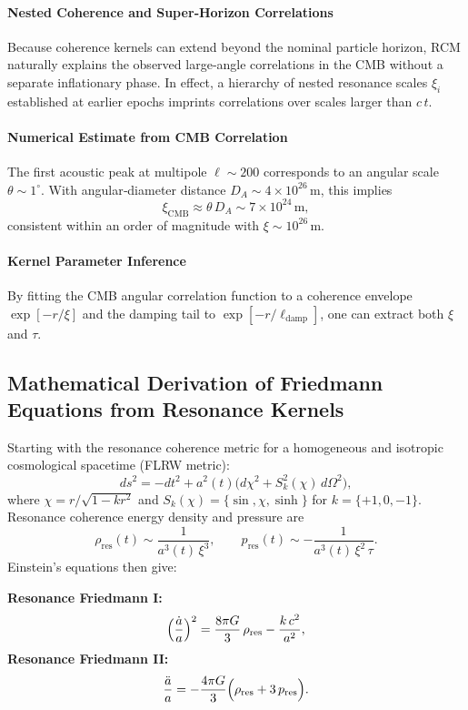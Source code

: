 \paragraph{Nested Coherence and Super‐Horizon Correlations}  
Because coherence kernels can extend beyond the nominal particle horizon, RCM naturally explains the observed large‐angle correlations in the CMB without a separate inflationary phase. In effect, a hierarchy of nested resonance scales \(\xi_i\) established at earlier epochs imprints correlations over scales larger than \(c\,t\).

\paragraph{Numerical Estimate from CMB Correlation}  
The first acoustic peak at multipole \(\ell\sim200\) corresponds to an angular scale \(\theta\sim1^\circ\). With angular‐diameter distance \(D_A\sim4\times10^{26}\,\mathrm{m}\), this implies
\[
\xi_{\mathrm{CMB}}\approx \theta\,D_A 
\sim 7\times10^{24}\,\mathrm{m},
\]
consistent within an order of magnitude with \(\xi\sim10^{26}\,\mathrm{m}\).

\paragraph{Kernel Parameter Inference}  
By fitting the CMB angular correlation function to a coherence envelope \(\exp[-r/\xi]\) and the damping tail to \(\exp[-r/\ell_{\mathrm{damp}}]\), one can extract both \(\xi\) and \(\tau\).

\subsection{Mathematical Derivation of Friedmann Equations from Resonance Kernels}

Starting with the resonance coherence metric for a homogeneous and isotropic cosmological spacetime (FLRW metric):
\[
ds^2 = -dt^2 + a^2(t)\!\bigl(d\chi^2 + S_k^2(\chi)\,d\Omega^2\bigr),
\]
where \(\chi=r/\sqrt{1-kr^2}\) and \(S_k(\chi)=\{\sin,\chi,\sinh\}\) for \(k=\{+1,0,-1\}\).  Resonance coherence energy density and pressure are
\[
\rho_{\mathrm{res}}(t)\sim \frac{1}{a^3(t)\,\xi^3}, 
\qquad
p_{\mathrm{res}}(t)\sim -\frac{1}{a^3(t)\,\xi^2\,\tau}.
\]
Einstein’s equations then give:

\begin{framed}
\noindent\textbf{Resonance Friedmann I:}
\[
\Bigl(\frac{\dot a}{a}\Bigr)^2
= \frac{8\pi G}{3}\,\rho_{\mathrm{res}}
- \frac{k\,c^2}{a^2},
\]
\textbf{Resonance Friedmann II:}
\[
\frac{\ddot a}{a}
= -\frac{4\pi G}{3}\Bigl(\rho_{\mathrm{res}}+3\,p_{\mathrm{res}}\Bigr).
\]
\end{framed}

